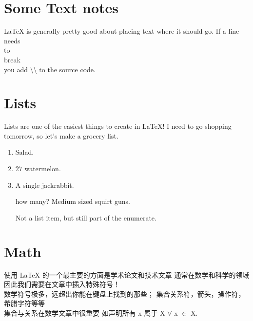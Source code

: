 \documentclass[12pt,UTF8]{article}
\begin{document}
\section{Some Text notes}
\LaTeX \hspace{1pt} is generally pretty good about placing text where it should
go. If 
a line \\ needs \\ to \\ break \\ you add \textbackslash\textbackslash 
\hspace{1pt} to the source code. \\ 

\section{Lists}
Lists are one of the easiest things to create in \LaTeX! I need to go shopping
tomorrow, so let's make a grocery list.
\begin{enumerate} %
  \item Salad.
  \item 27 watermelon.
  \item A single jackrabbit.
  \item[how many?] Medium sized squirt guns.

  Not a list item, but still part of the enumerate.

\end{enumerate} %

\section{Math}

使用 \LaTeX \hspace{1pt} 的一个最主要的方面是学术论文和技术文章
通常在数学和科学的领域 
因此我们需要在文章中插入特殊符号！ \\

数学符号极多，远超出你能在键盘上找到的那些；
集合关系符，箭头，操作符，希腊字符等等 \\

集合与关系在数学文章中很重要
如声明所有 x 属于 X $\forall$ x $\in$ X. \\
\end{document}
